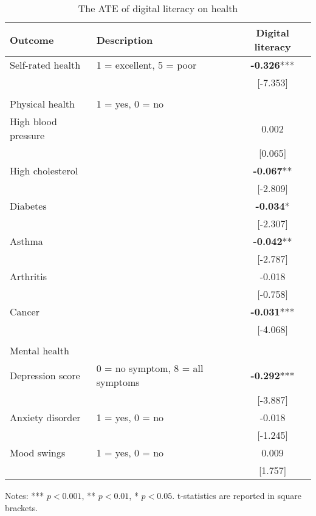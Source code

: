 \documentclass[11pt]{article}
\begin{document}
    \begin{table}[h!]
        \centering
        \caption{The ATE of digital literacy on health}
        \label{tab:iptw}
        \begin{threeparttable}
            \begin{tabular}{llc}
                \toprule
                Outcome & Description & Digital literacy \\
                \midrule
                Self-rated health & 1 = excellent, 5 = poor & \textbf{-0.326}*** \\
                & & [-7.353] \\
                & & \\
                Physical health & 1 = yes, 0 = no & \\
                High blood pressure &  & 0.002 \\
                &  & [0.065] \\
                High cholesterol &  & \textbf{-0.067}** \\
                &  & [-2.809] \\
                Diabetes &  & \textbf{-0.034}* \\
                &  & [-2.307] \\
                Asthma &  & \textbf{-0.042}** \\
                &  & [-2.787] \\
                Arthritis &  & -0.018 \\
                &  & [-0.758] \\
                Cancer &  & \textbf{-0.031}*** \\
                &  & [-4.068] \\
                & & \\
                Mental health & & \\
                Depression score & 0 = no symptom, 8 = all symptoms & \textbf{-0.292}*** \\
                & & [-3.887] \\
                Anxiety disorder & 1 = yes, 0 = no  & -0.018 \\
                &  & [-1.245] \\
                Mood swings & 1 = yes, 0 = no  & 0.009 \\
                &  & [1.757] \\
                \bottomrule
            \end{tabular}
            \begin{tablenotes}
                \footnotesize
                \item Notes: *** $p < 0.001$, ** $p < 0.01$, * $p < 0.05$. t-statistics are reported in square brackets.
            \end{tablenotes}
        \end{threeparttable}
    \end{table}
\end{document}
